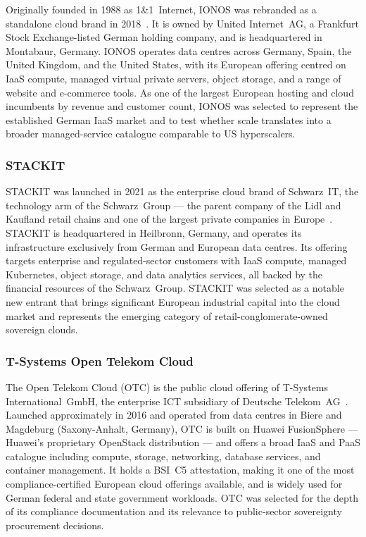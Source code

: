Originally founded in 1988 as 1\&1~Internet, IONOS was rebranded as a standalone cloud brand in 2018~\cite{IONOS_About}. It is owned by United Internet~AG, a Frankfurt Stock Exchange-listed German holding company, and is headquartered in Montabaur, Germany. IONOS operates data centres across Germany, Spain, the United Kingdom, and the United States, with its European offering centred on IaaS compute, managed virtual private servers, object storage, and a range of website and e-commerce tools. As one of the largest European hosting and cloud incumbents by revenue and customer count, IONOS was selected to represent the established German IaaS market and to test whether scale translates into a broader managed-service catalogue comparable to US hyperscalers.

\subsubsection{STACKIT}

STACKIT was launched in 2021 as the enterprise cloud brand of Schwarz~IT, the technology arm of the Schwarz~Group — the parent company of the Lidl and Kaufland retail chains and one of the largest private companies in Europe~\cite{STACKIT_About}. STACKIT is headquartered in Heilbronn, Germany, and operates its infrastructure exclusively from German and European data centres. Its offering targets enterprise and regulated-sector customers with IaaS compute, managed Kubernetes, object storage, and data analytics services, all backed by the financial resources of the Schwarz~Group. STACKIT was selected as a notable new entrant that brings significant European industrial capital into the cloud market and represents the emerging category of retail-conglomerate-owned sovereign clouds.

\subsubsection{T-Systems Open Telekom Cloud}

The Open Telekom Cloud (OTC) is the public cloud offering of T-Systems International~GmbH, the enterprise ICT subsidiary of Deutsche Telekom~AG~\cite{OTC_About}. Launched approximately in 2016 and operated from data centres in Biere and Magdeburg (Saxony-Anhalt, Germany), OTC is built on Huawei FusionSphere — Huawei's proprietary OpenStack distribution — and offers a broad IaaS and PaaS catalogue including compute, storage, networking, database services, and container management. It holds a BSI~C5 attestation, making it one of the most compliance-certified European cloud offerings available, and is widely used for German federal and state government workloads. OTC was selected for the depth of its compliance documentation and its relevance to public-sector sovereignty procurement decisions.

